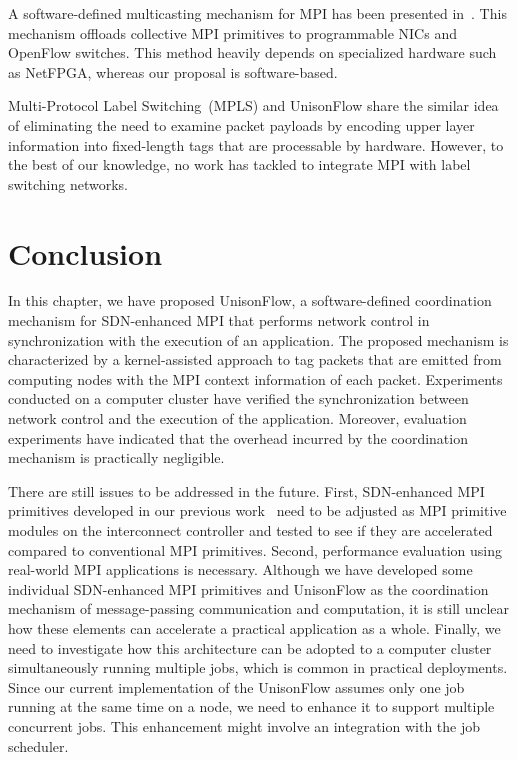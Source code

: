 A software-defined multicasting mechanism for MPI has been presented
in~\autocite{Arap2014}. This mechanism offloads collective MPI primitives to
programmable NICs and OpenFlow switches. This method heavily depends on
specialized hardware such as NetFPGA, whereas our proposal is software-based.

Multi-Protocol Label Switching~(MPLS) and UnisonFlow share the similar
idea of eliminating the need to examine packet payloads by encoding
upper layer information into fixed-length tags that are processable by
hardware. However, to the best of our knowledge, no work has tackled to
integrate MPI with label switching networks.

\section{Conclusion}\label{sec:iv-conclusion}

In this chapter, we have proposed UnisonFlow, a software-defined
coordination mechanism for SDN-enhanced MPI that performs network
control in synchronization with the execution of an application. The
proposed mechanism is characterized by a kernel-assisted approach to tag
packets that are emitted from computing nodes with the MPI context
information of each packet. Experiments conducted on a computer cluster
have verified the synchronization between network control and the
execution of the application. Moreover, evaluation experiments have
indicated that the overhead incurred by the coordination mechanism is
practically negligible.

There are still issues to be addressed in the future. First,
SDN-enhanced MPI primitives developed in our previous
work~\autocites{Dashdavaa2013}{Takahashi2014} need to be adjusted as MPI
primitive modules on the interconnect controller and tested to see if
they are accelerated compared to conventional MPI primitives. Second,
performance evaluation using real-world MPI applications is necessary.
Although we have developed some individual SDN-enhanced MPI primitives
and UnisonFlow as the coordination mechanism of message-passing
communication and computation, it is still unclear how these elements
can accelerate a practical application as a whole. Finally, we need to
investigate how this architecture can be adopted to a computer cluster
simultaneously running multiple jobs, which is common in practical
deployments. Since our current implementation of the UnisonFlow assumes
only one job running at the same time on a node, we need to enhance it
to support multiple concurrent jobs. This enhancement might involve an
integration with the job scheduler.
